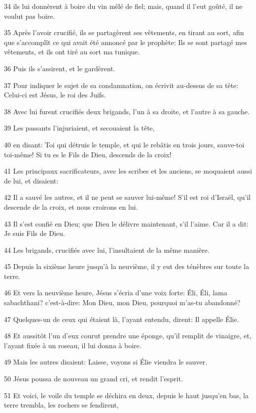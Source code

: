 \par 34 ils lui donnèrent à boire du vin mêlé de fiel; mais, quand il l'eut goûté, il ne voulut pas boire.
\par 35 Après l'avoir crucifié, ils se partagèrent ses vêtements, en tirant au sort, afin que s'accomplît ce qui avait été annoncé par le prophète: Ils se sont partagé mes vêtements, et ils ont tiré au sort ma tunique.
\par 36 Puis ils s'assirent, et le gardèrent.
\par 37 Pour indiquer le sujet de sa condamnation, on écrivit au-dessus de sa tête: Celui-ci est Jésus, le roi des Juifs.
\par 38 Avec lui furent crucifiés deux brigands, l'un à sa droite, et l'autre à sa gauche.
\par 39 Les passants l'injuriaient, et secouaient la tête,
\par 40 en disant: Toi qui détruis le temple, et qui le rebâtis en trois jours, sauve-toi toi-même! Si tu es le Fils de Dieu, descends de la croix!
\par 41 Les principaux sacrificateurs, avec les scribes et les anciens, se moquaient aussi de lui, et disaient:
\par 42 Il a sauvé les autres, et il ne peut se sauver lui-même! S'il est roi d'Israël, qu'il descende de la croix, et nous croirons en lui.
\par 43 Il s'est confié en Dieu; que Dieu le délivre maintenant, s'il l'aime. Car il a dit: Je suis Fils de Dieu.
\par 44 Les brigands, crucifiés avec lui, l'insultaient de la même manière.
\par 45 Depuis la sixième heure jusqu'à la neuvième, il y eut des ténèbres sur toute la terre.
\par 46 Et vers la neuvième heure, Jésus s'écria d'une voix forte: Éli, Éli, lama sabachthani? c'est-à-dire: Mon Dieu, mon Dieu, pourquoi m'as-tu abandonné?
\par 47 Quelques-un de ceux qui étaient là, l'ayant entendu, dirent: Il appelle Élie.
\par 48 Et aussitôt l'un d'eux courut prendre une éponge, qu'il remplit de vinaigre, et, l'ayant fixée à un roseau, il lui donna à boire.
\par 49 Mais les autres disaient: Laisse, voyons si Élie viendra le sauver.
\par 50 Jésus poussa de nouveau un grand cri, et rendit l'esprit.
\par 51 Et voici, le voile du temple se déchira en deux, depuis le haut jusqu'en bas, la terre trembla, les rochers se fendirent,
